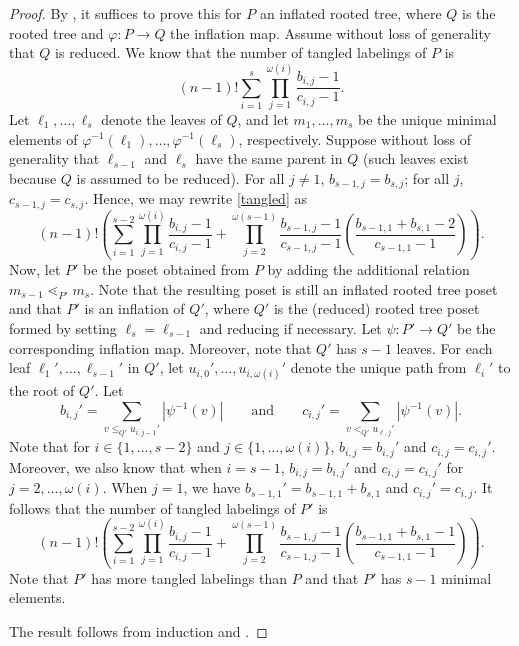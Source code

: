 \documentclass[11pt]{amsart}
\theoremstyle{definition}
\newcommand{\inverse}{^{-1}}
\begin{document}
\begin{proof}
	By , it suffices to prove this for $ P $ an inflated rooted tree, where $ Q $ is the rooted tree and $ \varphi:P\to Q $ the inflation map. Assume without loss of generality that $ Q $ is reduced. We know that the number of tangled labelings of $ P $ is \begin{equation}\label{tangled}
		(n-1)!\sum_{i=1}^{s}\prod_{j=1}^{\omega(i)}\frac{b_{i,j}-1}{c_{i,j}-1}.
	\end{equation} Let $ \ell_1,\ldots,\ell_s $ denote the leaves of $ Q $, and let $ m_1,\ldots,m_s $ be the unique minimal elements of $ \varphi\inverse(\ell_1),\ldots,\varphi\inverse(\ell_s) $, respectively. Suppose without loss of generality that $ \ell_{s-1} $ and $ \ell_s $ have the same parent in $ Q $ (such leaves exist because $ Q $ is assumed to be reduced). For all $ j\neq1 $, $ b_{s-1,j}=b_{s,j} $; for all $ j $, $ c_{s-1,j}=c_{s,j} $. Hence, we may rewrite \eqref{tangled} as \[(n-1)!\left(\sum_{i=1}^{s-2}\prod_{j=1}^{\omega(i)}\frac{b_{i,j}-1}{c_{i,j}-1}+\prod_{j=2}^{\omega(s-1)}\frac{b_{s-1,j}-1}{c_{s-1,j}-1}\left(\frac{b_{s-1,1}+b_{s,1}-2}{c_{s-1,1}-1}\right)\right).\] Now, let $ P' $ be the poset obtained from $ P $ by adding the additional relation $ m_{s-1}\lessdot_{P'}m_s $. Note that the resulting poset is still an inflated rooted tree poset and that $ P' $ is an inflation of $ Q' $, where $ Q' $ is the (reduced) rooted tree poset formed by setting $ \ell_s=\ell_{s-1} $ and reducing if necessary. Let $ \psi:P'\to Q' $ be the corresponding inflation map. Moreover, note that $ Q' $ has $ s-1 $ leaves. For each leaf $ \ell_1',\ldots,\ell_{s-1}' $ in $ Q' $, let $ u_{i,0}',\ldots,u_{i,\omega(i)}' $ denote the unique path from $ \ell_i' $ to the root of $ Q' $. Let \[b_{i,j}'=\sum_{v\leq_{Q'} u_{i,j-1}'}|\psi\inverse(v)|\qquad\mathrm{and}\qquad c_{i,j}'=\sum_{v<_{Q'} u_{\ell,j}'}|\psi\inverse(v)|.\] Note that for $ i\in\{1,\ldots,s-2\} $ and $ j\in\{1,\ldots,\omega(i)\} $, $ b_{i,j}=b_{i,j}' $ and $ c_{i,j}=c_{i,j}' $. Moreover, we also know that when $ i=s-1 $, $ b_{i,j}=b_{i,j}' $ and $ c_{i,j}=c_{i,j}' $ for $ j=2,\ldots,\omega(i) $. When $ j=1 $, we have $ b_{s-1,1}'=b_{s-1,1}+b_{s,1} $ and $ c_{i,j}'=c_{i,j} $. It follows that the number of tangled labelings of $ P' $ is \[(n-1)!\left(\sum_{i=1}^{s-2}\prod_{j=1}^{\omega(i)}\frac{b_{i,j}-1}{c_{i,j}-1}+\prod_{j=2}^{\omega(s-1)}\frac{b_{s-1,j}-1}{c_{s-1,j}-1}\left(\frac{b_{s-1,1}+b_{s,1}-1}{c_{s-1,1}-1}\right)\right).\] Note that $ P' $ has more tangled labelings than $ P $ and that $ P' $ has $ s-1 $ minimal elements. 
	
	The result follows from induction and .
\end{proof}
\end{document}
